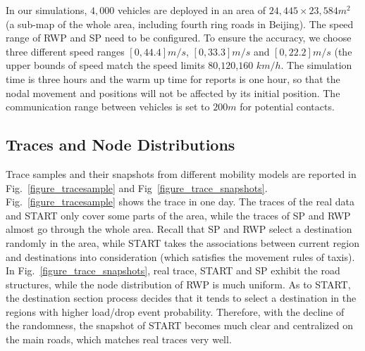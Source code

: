 In our simulations, $4,000$ vehicles are deployed in an area of $24,445\times 23,584 m^2$ (a sub-map of the whole area, including fourth ring roads in Beijing). The speed range of RWP and SP need to be configured. To ensure the accuracy, we choose three different speed ranges $[0,44.4]m/s$, $[0,33.3]m/s$ and $[0,22.2]m/s$ (the upper bounds of speed match the speed limits $80$,$120$,$160$ $km/h$. The simulation time is three hours and the warm up time for reports is one hour, so that the nodal movement and positions will not be affected by its initial position. The communication range between vehicles is set to $200m$ for potential contacts.

\subsection{Traces and Node Distributions}

Trace samples and their snapshots from different mobility models are reported in Fig.~\ref{figure_tracesample} and Fig~\ref{figure_trace_snapshots}. Fig.~\ref{figure_tracesample} shows the trace in one day. The traces of the real data and START only cover some parts of the area, while the traces of SP and RWP almost go through the whole area. Recall that SP and RWP select a destination randomly in the area, while START takes the associations between current region and destinations into consideration (which satisfies the movement rules of taxis). In Fig.~\ref{figure_trace_snapshots}, real trace, START and SP exhibit the road structures, while the node distribution of RWP is much uniform. As to START, the destination section process decides that it tends to select a destination in the regions with higher load/drop event probability. Therefore, with the decline of the randomness, the snapshot of START becomes much clear and centralized on the main roads, which matches real traces very well.


